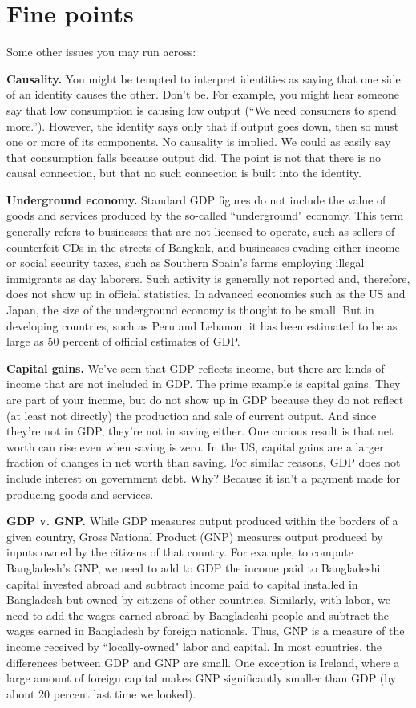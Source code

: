 \section{Fine points}

Some other issues you may run across:

\textbf{Causality.}
You might be tempted to interpret identities as saying that one side of an identity causes the other.
Don't be.
For example, you might hear someone say that
low consumption is causing low output
(``We need consumers to spend more.'').
However, the identity says only that if output goes down,
then so must one or more of its components.
No causality is implied.
We could as easily say that consumption falls because output did.
The point is not that there is no causal connection,
but that no such connection is built into the identity.

\textbf{Underground economy.}
Standard GDP figures do not include the value of goods and
services produced by the so-called ``underground" economy. This
term generally refers to businesses that are not licensed to
operate, such as sellers of counterfeit CDs in the streets of
Bangkok, and businesses evading either income or social security
taxes, such as Southern Spain's farms employing illegal immigrants
as day laborers.  Such activity is generally not reported and,
therefore, does not show up in official statistics. In advanced
economies such as the US and Japan, the size of the underground
economy is thought to be small.  But in developing countries, such
as Peru and Lebanon, it has been estimated to be as large as 50 percent
of official estimates of GDP.

\textbf{Capital gains.} We've seen that GDP reflects income, but
there are kinds of income that are not included in GDP. The
prime example is capital gains. They are part of your income, but
do not show up in GDP because they do not reflect (at least not
directly) the production and sale of current output. And since
they're not in GDP, they're not in saving either.
One curious result is that net worth can rise even when saving is zero.
In the US, capital gains are a larger fraction of changes in net worth
than saving.
For similar reasons, GDP does not include interest on government debt.
Why?  Because it isn't a payment
made for producing goods and services.


\textbf{GDP v. GNP.}
While GDP measures output produced within the borders of a
given country, Gross National Product (GNP) measures output produced by
inputs owned by the citizens of that country. For example, to
compute Bangladesh's GNP, we need to add to GDP the income
paid to Bangladeshi capital invested abroad and subtract income
paid to capital installed in Bangladesh but owned by citizens of
other countries. Similarly, with labor, we need to add the wages
earned abroad by Bangladeshi people and subtract the wages earned
in Bangladesh by foreign nationals. Thus, GNP is a measure of
the income received by ``locally-owned" labor and capital. In most
countries, the differences between GDP and GNP are small.
One exception is Ireland, where a large amount of foreign capital
makes GNP significantly smaller than GDP (by about 20 percent last
time we looked).

